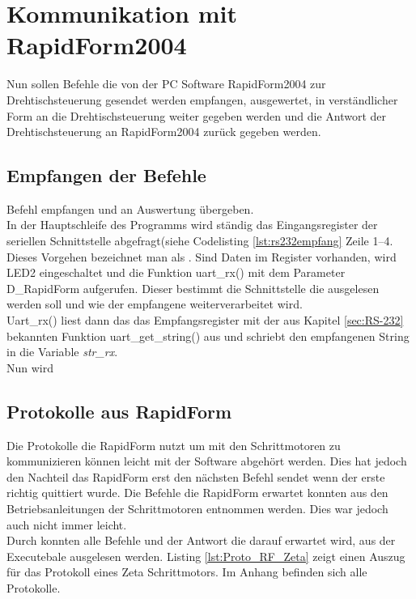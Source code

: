 \section{Kommunikation mit RapidForm2004}

Nun sollen Befehle die von der PC Software RapidForm2004 zur Drehtischsteuerung gesendet werden empfangen, ausgewertet, in verständlicher Form an die Drehtischsteuerung weiter gegeben werden und die Antwort der Drehtischsteuerung an RapidForm2004 zurück gegeben werden.
\subsection{Empfangen der Befehle}
Befehl empfangen und an Auswertung übergeben.\\
In der Hauptschleife des Programms wird ständig das Eingangsregister der seriellen Schnittstelle abgefragt(siehe Codelisting \ref{lst:rs232empfang} Zeile 1--4. Dieses Vorgehen bezeichnet man als .
Sind Daten im Register vorhanden, wird LED2 eingeschaltet und die Funktion uart\_rx() mit dem Parameter D\_RapidForm aufgerufen. Dieser bestimmt die Schnittstelle die ausgelesen werden soll und wie der empfangene  weiterverarbeitet wird. \\
Uart\_rx() liest dann das das Empfangsregister mit der aus Kapitel \ref{sec:RS-232} bekannten Funktion uart\_get\_string() aus und schriebt den empfangenen String in die Variable \emph{str\_rx}.\\
Nun wird

\lstset{language=Java, basicstyle=\footnotesize, showstringspaces=false, tabsize=8}






\subsection{Protokolle aus RapidForm}
Die Protokolle die RapidForm nutzt um mit den Schrittmotoren zu kommunizieren können leicht mit der Software  abgehört werden. Dies hat jedoch den Nachteil das RapidForm erst den nächsten Befehl sendet wenn der erste richtig quittiert wurde. Die Befehle die RapidForm erwartet konnten aus den Betriebsanleitungen der Schrittmotoren entnommen werden. Dies war jedoch auch nicht immer leicht.\\
Durch  konnten alle Befehle und der Antwort die darauf erwartet wird, aus der Executebale ausgelesen werden. Listing \ref{lst:Proto_RF_Zeta} zeigt einen Auszug für das Protokoll eines Zeta Schrittmotors. Im Anhang befinden sich alle Protokolle.
\lstset{language=C, basicstyle=\footnotesize, showstringspaces=false, tabsize=8}

